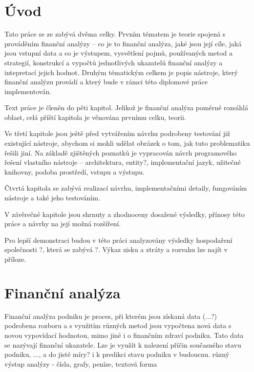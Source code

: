 \chapter{Úvod}
Tato práce se ze zabývá dvěma celky. Prvním tématem je teorie spojená s prováděním finanční analýzy -- co je to finanční analýza, jaké jsou její cíle, jaká jsou vstupní data a co je výstupem, vysvětlení pojmů, používaných metod a strategií, konstrukcí a vypočtů jednotlivých ukazatelů finanční analýzy a intepretací jejich hodnot. 
Druhým tématickým celkem je popis nástroje, který finanční analýzu provádí a který bude v rámci této diplomové práce implementován. 

Text práce je členěn do pěti kapitol. Jelikož je finanční analýza poměrně rozsáhlá oblast, celá příští kapitola je věnována prvnímu celku, teorii. 

Ve třetí kapitole jsou ještě před vytvářením návrhu podrobeny testování již existující nástroje, abychom si mohli udělat obrázek o tom, jak tuto problematiku řešili jiní. Na základě zjištěných poznatků je vypracován návrh programového řešení vlastního nástroje -- architektura, entity?, implementační jazyk, užitečné knihovny, podoba prostředí, vstupu a výstupu.

Čtvrtá kapitola se zabývá realizací návrhu, implementačními detaily, fungováním nástroje a také jeho testováním. 

V závěrečné kapitole jsou shrnuty a zhodnoceny dosažené výsledky, přínosy této práce a návrhy na její možná rozšíření.

Pro lepší demonstraci budou v této práci analyzovány výsledky hospodaření společnosti ?, která se zabývá ?. Výkaz zisku a ztráty a rozvahu lze najít v příloze.



























\chapter{Finanční analýza}


Finanční analýza podniku je proces, při kterém jsou získaná data (...?) podrobena rozboru a s využitím různých metod jsou vypočtena nová data s novou vypovídací hodnotou, mimo jiné i o finančním zdraví podniku. Tato data se nazývají finanční ukazatele. Lze je využít k nalezení příčin současného stavu podniku, ..., a do jisté míry? i k predikci stavu podniku v budoucnu.
různý výstup analýzy - čísla, grafy, peníze, textová forma

